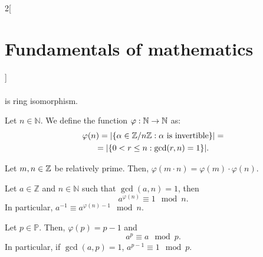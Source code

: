 \documentclass[../../../main.tex]{subfiles}
\begin{document}
\begin{multicols}{2}[\section{Fundamentals of mathematics}]
\begin{theorem}
\begin{align*}
    \end{align*}
    is ring isomorphism.
\end{theorem}
\begin{definition}
    Let $n\in\mathbb{N}$. We define the function $\varphi:\mathbb{N}\rightarrow\mathbb{N}$ as: 
    \begin{multline*}
        \varphi(n)=|\{\textstyle\alpha\in\quot{\ZZ}{n\ZZ}:\alpha \text{ is invertible}\}|=\\=|\{0<r\leq n: \gcd(r,n)=1\}|.
    \end{multline*}
\end{definition}
\begin{lemma}
    Let $m,n\in\mathbb{Z}$ be relatively prime. Then, $\varphi(m\cdot n)=\varphi(m)\cdot\varphi(n).$
\end{lemma}
\begin{theorem}
    Let $a\in\mathbb{Z}$ and $n\in\mathbb{N}$ such that $\gcd(a,n)=1$, then $$a^{\varphi(n)}\equiv 1\mod n.$$ In particular, $a^{-1}\equiv a^{\varphi(n)-1}\mod n$.
\end{theorem}
\begin{theorem}
    Let $p\in\mathbb{P}$. Then, $\varphi(p)=p-1$ and $$a^p\equiv a\mod p.$$ In particular, if $\gcd(a,p)=1$, $a^{p-1}\equiv 1\mod p$.
\end{theorem}

\end{multicols}
\end{document}
